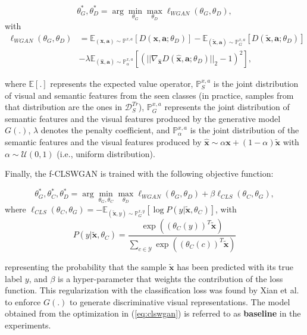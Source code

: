 \documentclass[runningheads]{llncs}
\begin{document}
\begin{equation}
\theta_G^*,\theta_D^*=\arg\min_{\theta_G} \max_{\theta_D} \ell_{WGAN}(\theta_G,\theta_D),  
\label{eq:wgan}
\end{equation}
with 
\begin{equation}
\begin{split}
\ell_{WGAN}(\theta_G,\theta_D) & = \mathbb E_{(\mathbf{x},\mathbf{a}) \sim \mathbb P^{x,a}}[D(\mathbf{x},\mathbf{a};\theta_D)] - \mathbb E_{(\widetilde{\mathbf{x}},\mathbf{a}) \sim \mathbb P^{x,a}_G}[D(\widetilde{\mathbf{x}},\mathbf{a};\theta_D)] \\ 
&- \lambda \mathbb E_{(\hat{\mathbf{x}},\mathbf{a}) \sim \mathbb P^{x,a}_{\alpha}}[\left(||\nabla_{\hat{\mathbf{x}}}D(\hat{\mathbf{x}},\mathbf{a}; \theta_D)||_2 - 1\right)^2], 
\end{split}
\label{eq:wgan}
\end{equation}


where $\mathbb E[.]$ represents the expected value operator, $\mathbb P_S^{x,a}$ is the joint distribution of visual and semantic features from the seen classes (in practice, samples from that distribution are the ones in $\mathcal{D}_S^{Tr}$), $\mathbb P^{x,a}_G$ represents the joint distribution of semantic features and the visual features produced by the generative model $G(.)$, $\lambda$ denotes the penalty coefficient, and $\mathbb P^{x,a}_{\alpha}$ is the joint distribution of the semantic features and the visual features produced by $\hat{\mathbf{x}} \sim \alpha \mathbf{x} + (1-\alpha)\widetilde{\mathbf{x}}$ with $\alpha \sim \mathcal{U}(0,1)$ (i.e., uniform distribution). 

Finally, the f-CLSWGAN is trained with the following objective function:


\begin{equation}
\theta_G^*,\theta_C^*,\theta_D^*=\arg\min_{\theta_G,\theta_C} \max_{\theta_D} \ell_{WGAN}(\theta_G,\theta_D) + \beta \ell_{CLS}(\theta_C,\theta_G),  
\label{eq:clswgan}
\end{equation}
where $\ell_{CLS}(\theta_C,\theta_G) = -\mathbb E_{(\widetilde{\mathbf{x}},y) \sim \mathbb P^{x,y}_G}[\log P(y | \widetilde{\mathbf{x}}, \theta_C)]$, with 
\begin{equation}
P(y | \widetilde{\mathbf{x}}, \theta_C) = \frac{\exp( (\theta_C(y))^T\widetilde{\mathbf{x}})}{\sum_{c\in \mathcal{Y}}\exp((\theta_C(c))^T\widetilde{\mathbf{x}})}
\label{eq:softmax}
\end{equation}


representing the probability that the sample $\widetilde{\mathbf{x}}$ has been predicted with its true
label $y$, and $\beta$ is a hyper-parameter that weights the contribution of the loss function.  This regularization with the classification loss was found by Xian et al.~\cite{XianCVPR2018} to enforce $G(.)$ to generate discriminative visual representations.  The model obtained from the optimization in (\ref{eq:clswgan}) is referred to as \textbf{baseline} in the experiments.
\end{document}
